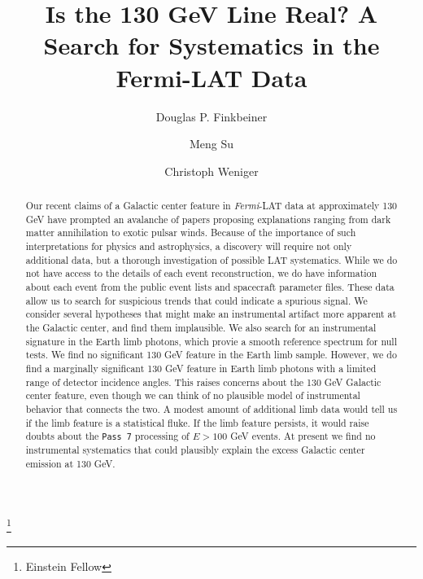 \documentclass[aps,twocolumn,prd,superscriptaddress,showpacs,nofootinbib,fixfloat]{revtex4}
\newcommand{\Fermi}{{\slshape Fermi}}
\begin{document}
\title{Is the 130 GeV Line Real? 
  A Search for Systematics in the Fermi-LAT Data}

\author{Douglas P. Finkbeiner}

\author{Meng Su}
\footnote{Einstein Fellow}

\author{Christoph Weniger}

\begin{abstract} Our recent claims of a Galactic center
  feature in \Fermi-LAT data at approximately 130 GeV have
  prompted an avalanche of papers proposing explanations
  ranging from dark matter annihilation to exotic pulsar
  winds.  Because of the importance of such interpretations
  for physics and astrophysics, a discovery will require not only additional
  data, but a thorough investigation of possible LAT
  systematics.  While we do not have access to the details
  of each event reconstruction, we do have information about
  each event from the public event lists and spacecraft
  parameter files.  These data allow us to search for
  suspicious trends that could indicate a spurious signal.
  We consider several hypotheses that might make an instrumental
  artifact more apparent at the Galactic center, and find them 
  implausible.  We also search for an instrumental signature in 
  the Earth limb photons, which provie a smooth
  reference spectrum for null tests.  We find no significant 
  130 GeV feature in the Earth limb sample.  However, we do 
  find a marginally significant 130 GeV feature in Earth 
  limb photons with a limited range of detector incidence angles.  
  This raises concerns about
  the 130 GeV Galactic center feature, even though we can
  think of no plausible model of instrumental behavior that
  connects the two.  A modest amount of additional limb data
  would tell us if the limb feature is a statistical fluke.
  If the limb feature persists, it would raise doubts
  about the \texttt{Pass 7} processing of $E > 100$ GeV events.  At present
  we find no instrumental systematics that could plausibly explain the excess
  Galactic center emission at 130 GeV. 
\end{abstract}
\end{document}
